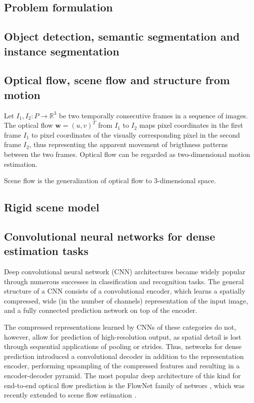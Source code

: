 
\subsection{Problem formulation}
\subsection{Object detection, semantic segmentation and instance segmentation}

\subsection{Optical flow, scene flow and structure from motion}
Let $I_1,I_2 : P \to \mathbb{R}^3$ be two temporally consecutive frames in a sequence of images.
The optical flow $\mathbf{w} = (u, v)^T$ from $I_1$ to $I_2$ maps pixel coordinates in the first
frame $I_1$ to pixel coordinates of the visually corresponding pixel in the second frame $I_2$, thus
representing the apparent movement of brigthness patterns between the two frames.
Optical flow can be regarded as two-dimensional motion estimation.

Scene flow is the generalization of optical flow to 3-dimensional space.

\subsection{Rigid scene model}
\subsection{Convolutional neural networks for dense estimation tasks}
Deep convolutional neural network (CNN) architectures \cite{} became widely popular
through numerous successes in classification and recognition tasks.
The general structure of a CNN consists of a convolutional encoder, which
learns a spatially compressed, wide (in the number of channels) representation of the input image,
and a fully connected prediction network on top of the encoder.

The compressed representations learned by CNNs of these categories do not, however, allow
for prediction of high-resolution output, as spatial detail is lost through sequential applications
of pooling or strides.
Thus, networks for dense prediction introduced a convolutional decoder in addition to the representation encoder,
performing upsampling of the compressed features and resulting in a encoder-decoder pyramid.
The most popular deep architecture of this kind for end-to-end optical flow prediction
is the FlowNet family of networs \cite{}, which was recently extended to scene flow estimation \cite{}.

